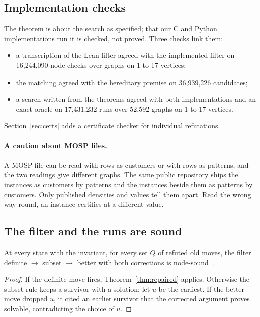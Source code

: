\subsection{Implementation checks}
\label{app:implementation}

The theorem is about the search
as specified; that our C and Python implementations run it is checked, not
proved. Three checks link them:
\begin{itemize}
\item a transcription of the Lean filter agreed with the implemented filter on
  16,244,090 node checks over graphs on 1 to 17 vertices;
\item the matching agreed with the hereditary premise on 36,939,226 candidates;
\item a search written from the theorems agreed with both implementations and
  an exact oracle on 17,431,232 runs over 52,592 graphs on 1 to 17 vertices.
\end{itemize}
Section~\ref{sec:certs} adds a certificate checker for individual
refutations.


\paragraph{A caution about MOSP files.} A MOSP file can be read with rows as
customers or with rows as patterns, and the two readings give different
graphs. The same public repository ships the
\citet{CarvalhoSoma2015} instances as customers by patterns and the
\citet{ChuStuckey2009} instances beside them as patterns by customers. Only
published densities and values tell them apart. Read the wrong way round, an
instance certifies at a different value.

\subsection{The filter and the runs are sound}
\label{app:machinery}

\begin{proposition}\label{prop:filter}
At every state with the invariant, for every set $Q$ of refuted old moves, the
filter definite $\to$ subset $\to$ better with both corrections is node-sound~.
\end{proposition}
\begin{proof}
If the definite move fires, Theorem~\ref{thm:repaired} applies. Otherwise the
subset rule keeps a survivor with a solution; let $u$ be the earliest. If the
better move dropped $u$, it cited an earlier survivor that the corrected
argument proves solvable, contradicting the choice of $u$.
\end{proof}


